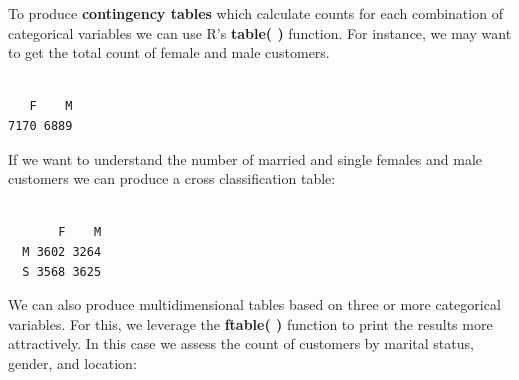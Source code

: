 \documentclass[
  letterpaper,
  DIV=11,
  numbers=noendperiod]{scrreprt}
\newenvironment{Shaded}{\begin{snugshade}}{\end{snugshade}}
\newcommand{\AttributeTok}[1]{\textcolor[rgb]{0.40,0.45,0.13}{#1}}
\newcommand{\CommentTok}[1]{\textcolor[rgb]{0.37,0.37,0.37}{#1}}
\newcommand{\FunctionTok}[1]{\textcolor[rgb]{0.28,0.35,0.67}{#1}}
\newcommand{\NormalTok}[1]{\textcolor[rgb]{0.00,0.23,0.31}{#1}}
\newcommand{\OtherTok}[1]{\textcolor[rgb]{0.00,0.23,0.31}{#1}}
\newcommand{\SpecialCharTok}[1]{\textcolor[rgb]{0.37,0.37,0.37}{#1}}
\newcommand{\StringTok}[1]{\textcolor[rgb]{0.13,0.47,0.30}{#1}}
\begin{document}
To produce \textbf{contingency tables} which calculate counts for each
combination of categorical variables we can use R's \textbf{table( )}
function. For instance, we may want to get the total count of female and
male customers.

\begin{Shaded}
\end{Shaded}

\begin{verbatim}

   F    M 
7170 6889 
\end{verbatim}

If we want to understand the number of married and single females and
male customers we can produce a cross classification table:

\begin{Shaded}
\end{Shaded}

\begin{verbatim}
   
       F    M
  M 3602 3264
  S 3568 3625
\end{verbatim}

We can also produce multidimensional tables based on three or more
categorical variables. For this, we leverage the \textbf{ftable( )}
function to print the results more attractively. In this case we assess
the count of customers by marital status, gender, and location:

\begin{Shaded}
\end{Shaded}
\end{document}
